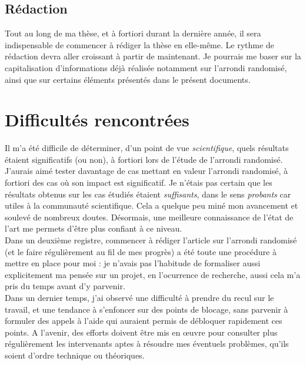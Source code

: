 \documentclass[a4paper,11pt]{article}
\begin{document}

\subsection{Rédaction}
Tout au long de ma thèse, et à fortiori durant la dernière année, il sera indispensable de commencer à rédiger la thèse en elle-même.
Le rythme de rédaction devra aller croissant à partir de maintenant. Je pourrais me baser sur la capitalisation d'informations déjà réalisée notamment sur l'arrondi randomisé, ainsi que sur certains éléments présentés dans le présent documents.

\section{Difficultés rencontrées}
Il m'a été difficile de déterminer, d'un point de vue \textit{scientifique}, quels résultats étaient significatifs (ou non), à fortiori lors de l'étude de l'arrondi randomisé. J'aurais aimé tester davantage de cas mettant en valeur l'arrondi randomisé, à fortiori des cas où son impact est significatif.
Je n'étais pas certain que les résultats obtenus sur les cas étudiés étaient \textit{suffisants}, dans le sens \textit{probants} car utiles à la communauté scientifique. Cela a quelque peu miné mon avancement et soulevé de nombreux doutes. Désormais, une meilleure connaissance de l'état de l'art me permets d'être plus confiant à ce niveau.\\
Dans un deuxième registre, commencer à rédiger l'article sur l'arrondi randomisé (et le faire régulièrement au fil de mes progrès) a été toute une procédure à mettre en place pour moi : je n'avais pas l'habitude de formaliser aussi explicitement ma pensée sur un projet, en l'ocurrence de recherche, aussi cela m'a pris du temps avant d'y parvenir.\\
Dans un dernier temps, j'ai observé une difficulté à prendre du recul sur le travail, et une tendance à s'enfoncer sur des points de blocage, sans parvenir à formuler des appels à l'aide qui auraient permis de débloquer rapidement ces points. A l'avenir, des efforts doivent être mis en œuvre pour consulter plus régulièrement les intervenants aptes à résoudre mes éventuels problèmes, qu'ils soient d'ordre technique ou théoriques.
\end{document}

